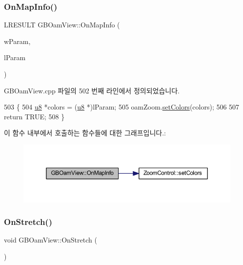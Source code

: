 \subsubsection{\texorpdfstring{On\+Map\+Info()}{OnMapInfo()}}
{\footnotesize\ttfamily L\+R\+E\+S\+U\+LT G\+B\+Oam\+View\+::\+On\+Map\+Info (\begin{DoxyParamCaption}\item[{W\+P\+A\+R\+AM}]{w\+Param,  }\item[{L\+P\+A\+R\+AM}]{l\+Param }\end{DoxyParamCaption})}



G\+B\+Oam\+View.\+cpp 파일의 502 번째 라인에서 정의되었습니다.


\begin{DoxyCode}
503 \{
504   \mbox{\hyperlink{_system_8h_aed742c436da53c1080638ce6ef7d13de}{u8}} *colors = (\mbox{\hyperlink{_system_8h_aed742c436da53c1080638ce6ef7d13de}{u8}} *)lParam;
505   oamZoom.\mbox{\hyperlink{class_zoom_control_a97501cc16d3068eefa1b5d9d23e9d0d9}{setColors}}(colors);
506   
507   \textcolor{keywordflow}{return} TRUE;
508 \}
\end{DoxyCode}
이 함수 내부에서 호출하는 함수들에 대한 그래프입니다.\+:
\nopagebreak
\begin{figure}[H]
\begin{center}
\leavevmode
\includegraphics[width=350pt]{class_g_b_oam_view_af5f1f2fd340a83cbf218ef8be53f4089_cgraph}
\end{center}
\end{figure}
\mbox{\label{class_g_b_oam_view_a580f292889a2fd21ab0bbf217d6abaa3}} 
\subsubsection{\texorpdfstring{On\+Stretch()}{OnStretch()}}
{\footnotesize\ttfamily void G\+B\+Oam\+View\+::\+On\+Stretch (\begin{DoxyParamCaption}{ }\end{DoxyParamCaption})\hspace{0.3cm}{\ttfamily [protected]}}



